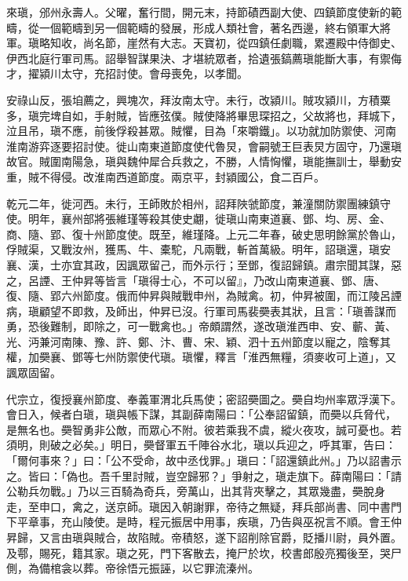 
\begin{pinyinscope}

 來瑱，邠州永壽人。父曜，奮行間，開元末，持節磧西副大使、四鎮節度使新的範疇，從一個範疇到另一個範疇的發展，形成人類社會，著名西邊，終右領軍大將軍。瑱略知收，尚名節，崖然有大志。天寶初，從四鎮任劇職，累遷殿中侍御史、伊西北庭行軍司馬。詔舉智謀果決、才堪統眾者，拾遺張鎬薦瑱能斷大事，有禦侮才，擢潁川太守，充招討使。會母喪免，以孝聞。



 安祿山反，張垍薦之，興塊次，拜汝南太守。未行，改潁川。賊攻潁川，方積粟多，瑱完埤自如，手射賊，皆應弦僕。賊使降將畢思琛招之，父故將也，拜城下，泣且吊，瑱不應，前後俘殺甚眾。賊懼，目為「來嚼鐵」。以功就加防禦使、河南淮南游弈逐要招討使。徙山南東道節度使代魯炅，會嗣號王巨表炅方固守，乃還瑱故官。賊圍南陽急，瑱與魏仲犀合兵救之，不勝，人情恟懼，瑱能撫訓士，舉動安重，賊不得侵。改淮南西道節度。兩京平，封潁國公，食二百戶。



 乾元二年，徙河西。未行，王師敗於相州，詔拜陜虢節度，兼潼關防禦團練鎮守使。明年，襄州部將張維瑾等殺其使史翽，徙瑱山南東道襄、鄧、均、房、金、商、隨、郢、復十州節度使。既至，維瑾降。上元二年春，破史思明餘黨於魯山，俘賊渠，又戰汝州，獲馬、牛、橐駝，凡兩戰，斬首萬級。明年，詔瑱還，瑱安襄、漢，士亦宜其政，因諷眾留己，而外示行；至鄧，復詔歸鎮。肅宗聞其謀，惡之，呂諲、王仲昇等皆言「瑱得士心，不可以留』，乃改山南東道襄、鄧、唐、復、隨、郢六州節度。俄而仲昇與賊戰申州，為賊禽。初，仲昇被圍，而江陵呂諲病，瑱顧望不即救，及師出，仲昇已沒。行軍司馬裴奰表其狀，且言：「瑱善謀而勇，恐後難制，即除之，可一戰禽也。」帝頗謂然，遂改瑱淮西申、安、蘄、黃、光、沔兼河南陳、豫、許、鄭、汴、曹、宋、穎、泗十五州節度以寵之，陰奪其權，加奰襄、鄧等七州防禦使代瑱。瑱懼，釋言「淮西無糧，須麥收可上道」，又諷眾固留。



 代宗立，復授襄州節度、奉義軍渭北兵馬使；密詔奰圖之。奰自均州率眾浮漢下。會日入，候者白瑱，瑱與帳下謀，其副薛南陽曰：「公奉詔留鎮，而奰以兵脅代，是無名也。奰智勇非公敵，而眾心不附。彼若乘我不虞，縱火夜攻，誠可憂也。若須明，則破之必矣。」明日，奰督軍五千陣谷水北，瑱以兵迎之，呼其軍，告曰：「爾何事來？」曰：「公不受命，故中丞伐罪。」瑱曰：「詔還鎮此州。」乃以詔書示之。皆曰：「偽也。吾千里討賊，豈空歸邪？」爭射之，瑱走旗下。薛南陽曰：「請公勒兵勿戰。」乃以三百騎為奇兵，旁萬山，出其背夾擊之，其眾幾盡，奰脫身走，至申口，禽之，送京師。瑱因入朝謝罪，帝待之無疑，拜兵部尚書、同中書門下平章事，充山陵使。是時，程元振居中用事，疾瑱，乃告與巫祝言不順。會王仲昇歸，又言由瑱與賊合，故陷賊。帝積怒，遂下詔削除官爵，貶播川尉，員外置。及鄠，賜死，籍其家。瑱之死，門下客散去，掩尸於坎，校書郎殷亮獨後至，哭尸側，為備棺衾以葬。帝徐悟元振誣，以它罪流溱州。




\end{pinyinscope}
